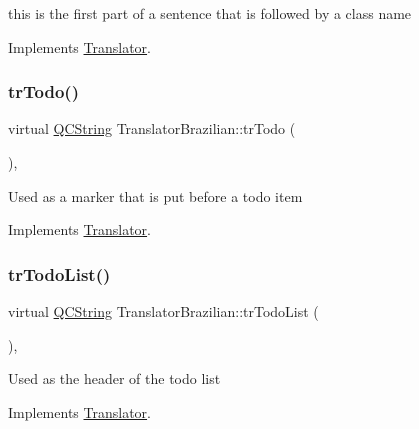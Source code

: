 this is the first part of a sentence that is followed by a class name 

Implements \mbox{\hyperlink{class_translator}{Translator}}.

\mbox{\label{class_translator_brazilian_a1cb9c63ca198875cf5c77014bbe88f66}} 
\subsubsection{\texorpdfstring{trTodo()}{trTodo()}}
{\footnotesize\ttfamily virtual \mbox{\hyperlink{class_q_c_string}{Q\+C\+String}} Translator\+Brazilian\+::tr\+Todo (\begin{DoxyParamCaption}{ }\end{DoxyParamCaption})\hspace{0.3cm}{\ttfamily [inline]}, {\ttfamily [virtual]}}

Used as a marker that is put before a todo item 

Implements \mbox{\hyperlink{class_translator}{Translator}}.

\mbox{\label{class_translator_brazilian_a0e9e36cca0bd908466bd5ebc269b68d5}} 
\subsubsection{\texorpdfstring{trTodoList()}{trTodoList()}}
{\footnotesize\ttfamily virtual \mbox{\hyperlink{class_q_c_string}{Q\+C\+String}} Translator\+Brazilian\+::tr\+Todo\+List (\begin{DoxyParamCaption}{ }\end{DoxyParamCaption})\hspace{0.3cm}{\ttfamily [inline]}, {\ttfamily [virtual]}}

Used as the header of the todo list 

Implements \mbox{\hyperlink{class_translator}{Translator}}.

\mbox{\label{class_translator_brazilian_afe7e05ce6fac9cd006e48c9919557147}} 
